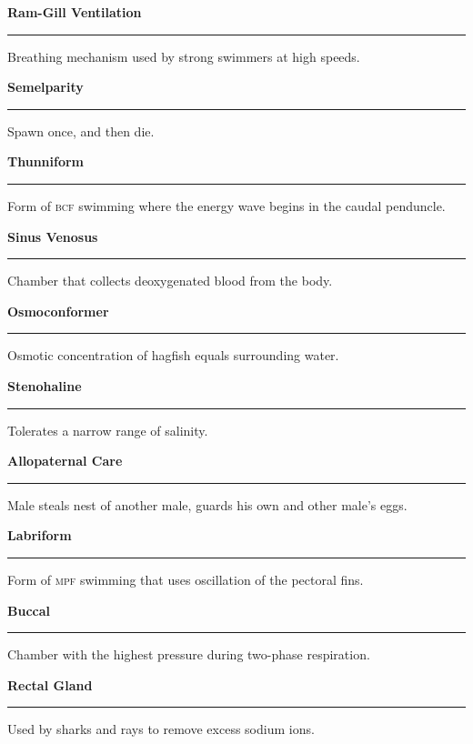 \documentclass[11pt, addpoints]{exam}
\newcommand*\Matching[1]{
\ifprintanswers
	\textbf{#1}
\else
	\rule{2.1in}{0.5pt}
\fi
}
\newlength\matchlena
\newlength\matchlenb
\newcommand\MatchQuestion[2]{%
	\setlength\matchlenb{\linewidth}
	\addtolength\matchlenb{-\matchlena}
	\parbox[t]{\matchlena}{\Matching{#1}}\enspace\parbox[t]{\matchlenb}{#2}}
\newcommand{\bumppoints}[1]{%
	\addtocounter{numpoints}{#1}
}
\begin{document}
\begin{questions}

\vspace{-1\baselineskip}
\fullwidth{%

}
\vspace{0.4\baselineskip}

\bumppoints{20}

\question\MatchQuestion{Ram-Gill Ventilation}{Breathing mechanism used by strong swimmers at high speeds.}
\vspace{0.4\baselineskip}

\question\MatchQuestion{Semelparity}{Spawn once, and then die.}
\vspace{0.4\baselineskip}

\question\MatchQuestion{Thunniform}{Form of \textsc{bcf} swimming where the energy wave begins in the caudal penduncle.}
\vspace{0.5\baselineskip}

\question\MatchQuestion{Sinus Venosus}{Chamber that collects deoxygenated blood from the body.}
\vspace{0.4\baselineskip}

\question\MatchQuestion{Osmoconformer}{Osmotic concentration of hagfish equals surrounding water.}
\vspace{0.4\baselineskip}

\question\MatchQuestion{Stenohaline}{Tolerates a narrow range of salinity.}
\vspace{0.4\baselineskip}

\question\MatchQuestion{Allopaternal Care}{Male steals nest of another male, guards his own and other male’s eggs.}
\vspace{0.4\baselineskip}

\question\MatchQuestion{Labriform}{Form of \textsc{mpf} swimming that uses oscillation of the pectoral fins.}
\vspace{0.5\baselineskip}

\question\MatchQuestion{Buccal}{Chamber with the highest pressure during two-phase respiration.}
\vspace{0.5\baselineskip}

\question\MatchQuestion{Rectal Gland}{Used by sharks and rays to remove excess sodium ions.}

\vspace{1\baselineskip}


\end{questions}
\end{document}
